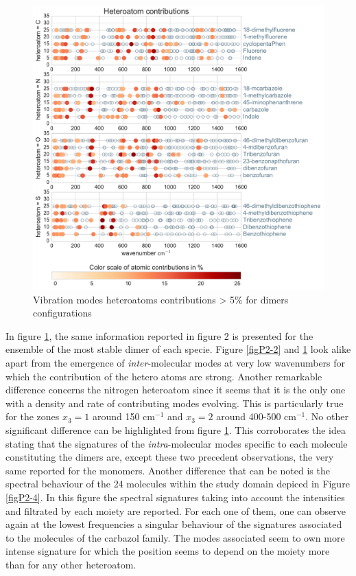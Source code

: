 	
	
	
		\begin{figure}[H]
			\begin{center}
				\includegraphics[scale=0.7]{image/P2-3}
			\end{center}
			\caption{Vibration modes heteroatoms contributions > 5\% for dimers configurations}  \label{figP2-3}
		\end{figure}
	
	
In figure \ref{figP2-3}, the same information reported in figure 2 is presented for the ensemble of the most stable dimer of each specie. Figure \ref{figP2-2} and \ref{figP2-3} look alike apart from the emergence of \textit{inter}-molecular modes at very low wavenumbers for which the contribution of the hetero atoms are strong. Another remarkable difference concerns the nitrogen heteroatom since it seems that it is the only one with a density and rate of contributing modes evolving. This is particularly true for the zones $x_3=1$ around 150 cm$^{-1}$ and $x_3=2$ around 400-500 cm$^{-1}$. No other significant difference can be highlighted from figure \ref{figP2-3}. This corroborates the idea stating that the signatures of the \textit{intra}-molecular modes specific to each molecule constituting the dimers are, except these two precedent observations, the very same reported for the monomers. 
Another difference that can be noted is the spectral behaviour of the 24 molecules within the study domain depiced in Figure \ref{figP2-4}. In this figure the spectral signatures taking into account the intensities and filtrated by each moiety are reported. For each one of them, one can observe again at the lowest frequencies a singular behaviour of the signatures associated to the molecules of the carbazol family. The modes associated seem to own more intense signature for which the position seems to depend on the moiety more than for any other heteroatom.	
	
